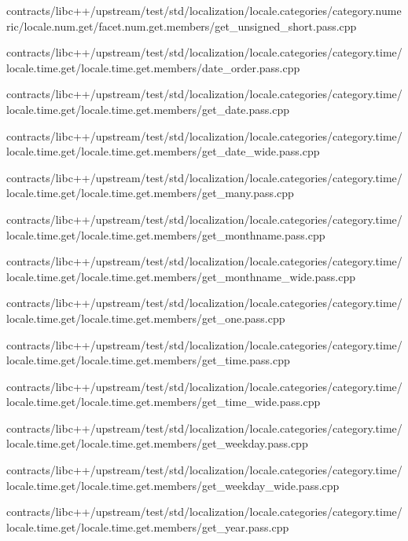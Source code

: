 \begin{DoxyCompactItemize}
contracts/libc++/upstream/test/std/localization/locale.\+categories/category.\+numeric/locale.\+num.\+get/facet.\+num.\+get.\+members/get\+\_\+unsigned\+\_\+short.\+pass.\+cpp\item 
contracts/libc++/upstream/test/std/localization/locale.\+categories/category.\+time/locale.\+time.\+get/locale.\+time.\+get.\+members/date\+\_\+order.\+pass.\+cpp\item 
contracts/libc++/upstream/test/std/localization/locale.\+categories/category.\+time/locale.\+time.\+get/locale.\+time.\+get.\+members/get\+\_\+date.\+pass.\+cpp\item 
contracts/libc++/upstream/test/std/localization/locale.\+categories/category.\+time/locale.\+time.\+get/locale.\+time.\+get.\+members/get\+\_\+date\+\_\+wide.\+pass.\+cpp\item 
contracts/libc++/upstream/test/std/localization/locale.\+categories/category.\+time/locale.\+time.\+get/locale.\+time.\+get.\+members/get\+\_\+many.\+pass.\+cpp\item 
contracts/libc++/upstream/test/std/localization/locale.\+categories/category.\+time/locale.\+time.\+get/locale.\+time.\+get.\+members/get\+\_\+monthname.\+pass.\+cpp\item 
contracts/libc++/upstream/test/std/localization/locale.\+categories/category.\+time/locale.\+time.\+get/locale.\+time.\+get.\+members/get\+\_\+monthname\+\_\+wide.\+pass.\+cpp\item 
contracts/libc++/upstream/test/std/localization/locale.\+categories/category.\+time/locale.\+time.\+get/locale.\+time.\+get.\+members/get\+\_\+one.\+pass.\+cpp\item 
contracts/libc++/upstream/test/std/localization/locale.\+categories/category.\+time/locale.\+time.\+get/locale.\+time.\+get.\+members/get\+\_\+time.\+pass.\+cpp\item 
contracts/libc++/upstream/test/std/localization/locale.\+categories/category.\+time/locale.\+time.\+get/locale.\+time.\+get.\+members/get\+\_\+time\+\_\+wide.\+pass.\+cpp\item 
contracts/libc++/upstream/test/std/localization/locale.\+categories/category.\+time/locale.\+time.\+get/locale.\+time.\+get.\+members/get\+\_\+weekday.\+pass.\+cpp\item 
contracts/libc++/upstream/test/std/localization/locale.\+categories/category.\+time/locale.\+time.\+get/locale.\+time.\+get.\+members/get\+\_\+weekday\+\_\+wide.\+pass.\+cpp\item 
contracts/libc++/upstream/test/std/localization/locale.\+categories/category.\+time/locale.\+time.\+get/locale.\+time.\+get.\+members/get\+\_\+year.\+pass.\+cpp\item 

\end{DoxyCompactItemize}
